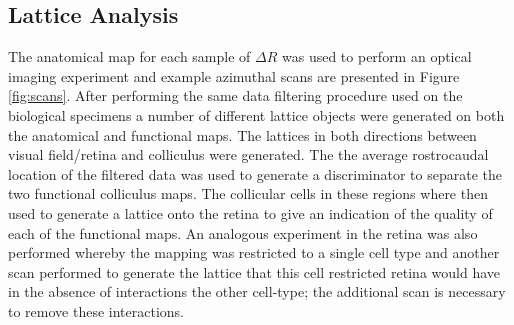 \subsection{Lattice Analysis}
The anatomical map for each sample of $\Delta R$ was used to perform an optical imaging experiment and example azimuthal scans are presented in Figure \ref{fig:scans}. After performing the same data filtering procedure used on the biological specimens a number of different lattice objects were generated on both the anatomical and functional maps. The lattices in both directions between visual field/retina and colliculus were generated. The the average rostrocaudal location of the filtered data was used to generate a discriminator to separate the two functional colliculus maps. The collicular cells in these regions where then used to generate a lattice onto the retina to give an indication of the quality of each of the functional maps. An analogous experiment in the retina was also performed whereby the mapping was restricted to a single cell type and another scan performed to generate the lattice that this cell restricted retina would have in the absence of interactions the other cell-type; the additional scan is necessary to remove these interactions.
